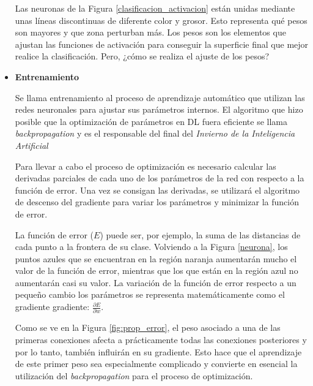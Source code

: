\begin{itemize}
    Las neuronas de la Figura \ref{clasificacion_activacion} están unidas mediante unas líneas discontinuas de diferente color y grosor. Esto representa qué pesos son mayores y que zona perturban más. Los pesos son los elementos que ajustan las funciones de activación para conseguir la superficie final que mejor realice la clasificación. Pero, ¿cómo se realiza el ajuste de los pesos?
    
    \item[\tiny{\textbullet}] \textbf{Entrenamiento}
    
    Se llama entrenamiento al proceso de aprendizaje automático que utilizan las redes neuronales para ajustar sus parámetros internos. El algoritmo que hizo posible que la optimización de parámetros en DL fuera eficiente se llama \textit{backpropagation} y es el responsable del final del \textit{Invierno de la Inteligencia Artificial}
    
    Para llevar a cabo el proceso de optimización es necesario calcular las derivadas parciales de cada uno de los parámetros de la red con respecto a la función de error. Una vez se consigan las derivadas, se utilizará el algoritmo de descenso del gradiente para variar los parámetros y minimizar la función de error.
    
    La función de error ($E$) puede ser, por ejemplo, la suma de las distancias de cada punto a la frontera de su clase. Volviendo a la Figura \ref{neurona}, los puntos azules que se encuentran en la región naranja aumentarán mucho el valor de la función de error, mientras que los que están en la región azul no aumentarán casi su valor. La variación de la función de error respecto a un pequeño cambio los parámetros se representa matemáticamente como el gradiente gradiente: $\frac{\partial E}{\partial w}$.
    
    Como se ve en la Figura \ref{fig:prop_error}, el peso asociado a una de las primeras conexiones afecta a prácticamente todas las conexiones posteriores y por lo tanto, también influirán en su gradiente. Esto hace que el aprendizaje de este primer peso sea especialmente complicado y convierte en esencial la utilización del \textit{backpropagation} para el proceso de optimización.
    

\end{itemize}
